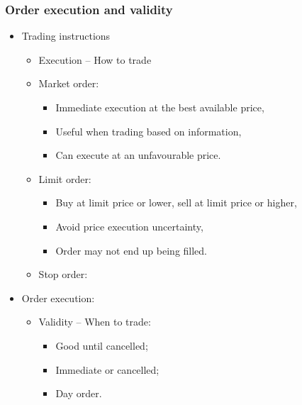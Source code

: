\documentclass[../notes_compiled.tex]{subfiles}
\begin{document}
\subsubsection{Order execution and validity}
\begin{itemize}
\item Trading instructions
\begin{itemize}
\item Execution -- How to trade
\item Market order:
\begin{itemize}
\item Immediate execution at the best available price,
\item Useful when trading based on information,
\item Can execute at an unfavourable price.
\end{itemize}

\item Limit order:
\begin{itemize}
\item Buy at limit price or lower, sell at limit price or higher,
\item Avoid price execution uncertainty,
\item Order may not end up being filled.
\end{itemize}

\item Stop order:


\end{itemize}

\item Order execution:
\begin{itemize}
\item Validity -- When to trade:
\begin{itemize}
\item Good until cancelled;
\item Immediate or cancelled;
\item Day order.
\end{itemize}


\end{itemize}
\end{itemize}
\end{document}
